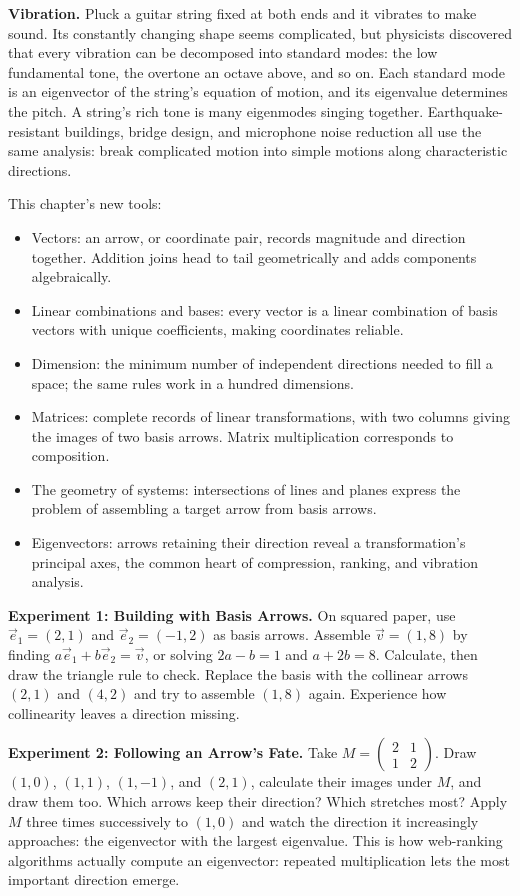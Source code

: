 \textbf{Vibration.} Pluck a guitar string fixed at both ends and it vibrates to make sound. Its constantly changing shape seems complicated, but physicists discovered that every vibration can be decomposed into standard modes: the low fundamental tone, the overtone an octave above, and so on. Each standard mode is an eigenvector of the string's equation of motion, and its eigenvalue determines the pitch. A string's rich tone is many eigenmodes singing together. Earthquake-resistant buildings, bridge design, and microphone noise reduction all use the same analysis: break complicated motion into simple motions along characteristic directions.

\begin{toolbox}
This chapter's new tools:
\begin{itemize}
\item Vectors: an arrow, or coordinate pair, records magnitude and direction together. Addition joins head to tail geometrically and adds components algebraically.
\item Linear combinations and bases: every vector is a linear combination of basis vectors with unique coefficients, making coordinates reliable.
\item Dimension: the minimum number of independent directions needed to fill a space; the same rules work in a hundred dimensions.
\item Matrices: complete records of linear transformations, with two columns giving the images of two basis arrows. Matrix multiplication corresponds to composition.
\item The geometry of systems: intersections of lines and planes express the problem of assembling a target arrow from basis arrows.
\item Eigenvectors: arrows retaining their direction reveal a transformation's principal axes, the common heart of compression, ranking, and vibration analysis.
\end{itemize}
\end{toolbox}

\begin{shiyan}
\textbf{Experiment 1: Building with Basis Arrows.} On squared paper, use $\vec{e}_1=(2,1)$ and $\vec{e}_2=(-1,2)$ as basis arrows. Assemble $\vec{v}=(1,8)$ by finding $a\vec{e}_1+b\vec{e}_2=\vec{v}$, or solving $2a-b=1$ and $a+2b=8$. Calculate, then draw the triangle rule to check. Replace the basis with the collinear arrows $(2,1)$ and $(4,2)$ and try to assemble $(1,8)$ again. Experience how collinearity leaves a direction missing.

\textbf{Experiment 2: Following an Arrow's Fate.} Take $M=\begin{pmatrix}2&1\\1&2\end{pmatrix}$. Draw $(1,0)$, $(1,1)$, $(1,-1)$, and $(2,1)$, calculate their images under $M$, and draw them too. Which arrows keep their direction? Which stretches most? Apply $M$ three times successively to $(1,0)$ and watch the direction it increasingly approaches: the eigenvector with the largest eigenvalue. This is how web-ranking algorithms actually compute an eigenvector: repeated multiplication lets the most important direction emerge.
\end{shiyan}

